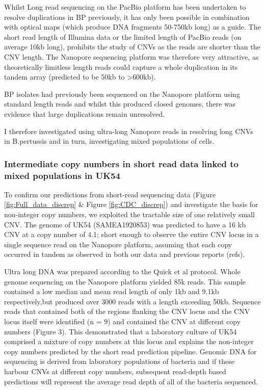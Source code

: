 \documentclass{article}
\begin{document}
Whilst Long read sequencing on the PacBio platform has been undertaken to resolve duplications in BP previously, it has only been possible in combination with optical maps (which produce DNA fragments 50-750kb long) as a guide. The short read length of Illumina data or the limited length of PacBio reads (on average 10kb long), prohibits the study of CNVs as the reads are shorter than the CNV length. The Nanopore sequencing platform was therefore very attractive, as theoretically limitless length reads could capture a whole duplication in its tandem array (predicted to be 50kb to >600kb). 

BP isolates had previously been sequenced on the Nanopore platform using standard length reads and whilst this produced closed genomes, there was evidence that large duplications remain unresolved.

I therefore  investigated using ultra-long Nanopore reads in resolving long CNVs in B.pertussis  and in turn, investigating mixed populations of cells.

\subsubsection{Intermediate copy numbers in short read data linked to mixed populations in UK54}
To confirm our predictions from short-read sequencing data (Figure \ref{fig:Full_data_discrep} & Figure \ref{fig:CDC_discrep}) and investigate the basis for non-integer copy numbers, we exploited the tractable size of one relatively small CNV. The genome of UK54 (SAMEA1920853) was predicted to have a 16 kb CNV at a copy number of 4.1; short enough to observe the entire CNV locus in a single sequence read on the Nanopore platform, assuming that each copy occurred in tandem as observed in both our data and previous reports (refs). 

Ultra long DNA was prepared according to the Quick et al protocol. Whole genome sequencing on the Nanopore platform yielded 85k reads. This sample contained a low median and mean read length of only 1kb and 9.1kb  respectively,but produced over 3000 reads with a length exceeding 50kb. Sequence reads that contained both of the regions flanking the CNV locus and the CNV locus itself were identified (n = 9) and contained the CNV at different copy numbers (Figure 3). This demonstrated that a laboratory culture of UK54 comprised a mixture of copy numbers at this locus and explains the non-integer copy numbers predicted by the short read prediction pipeline. Genomic DNA for sequencing is derived from laboratory populations of bacteria and if these harbour CNVs at different copy numbers, subsequent read-depth based predictions will represent the average read depth of all of the bacteria sequenced.
\end{document}
